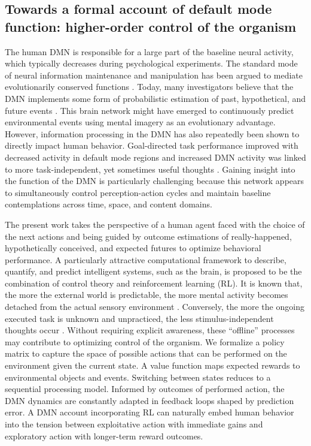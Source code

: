 \documentclass[10pt,letterpaper]{article}
\begin{document}
\subsection{Towards a formal account of default mode function: higher-order control of the organism}
The human DMN is responsible for a large part of the baseline neural activity,
which typically decreases during psychological experiments.
The standard mode of
neural information maintenance and manipulation has
been argued to mediate evolutionarily conserved functions
\citep{brown1914nature, binder1999conceptual, buzsaki2006rhythms}.
Today, many investigators believe that the DMN implements some form of
probabilistic estimation of past, hypothetical, and
future events
\citep{fox2005, hassabis2007patients, schacter2007remembering, binder2009,
randy2008}.
This brain network
might have emerged to continuously predict environmental events using
mental imagery as an evolutionary advantage.
%
However, information processing in the DMN has also repeatedly
been shown to directly impact human behavior. Goal-directed task performance
improved with decreased activity in default mode regions \citep{weiss2006}
and increased DMN activity was linked to more task-independent,
yet sometimes useful thoughts
\citep{mason2007, seli2016mind}.
%
Gaining insight into the function of the DMN is
particularly challenging because
this network appears to
simultaneously control perception-action cycles and
maintain baseline contemplations
across time, space, and content domains.


The present work takes the perspective of
a human agent faced with the choice of the next actions
and being guided by outcome estimations
of really-happened, hypothetically conceived, and
expected futures to optimize behavioral performance.
A particularly attractive computational framework
to describe, quantify, and predict intelligent systems, such as the brain,
is proposed to be the combination of control theory and
reinforcement learning (RL).
It is known that, the more the external world is predictable,
the more mental activity becomes detached from the actual sensory environment
\citep{antrobus1966studies, pope1978regulation}.
Conversely,
the more the ongoing executed task is unknown and unpracticed,
the less stimulus-independent thoughts occur
\citep{filler1973daydreaming, teasdale1995stimulus, christoff2016mind}.
Without requiring explicit awareness,
these ``offline'' processes may contribute
to optimizing control of the organism.
We formalize
a policy matrix to capture the space of possible actions that can be performed
on the environment given the current state. A value function
maps expected rewards to environmental objects and events.
Switching between states reduces to a sequential processing model.
Informed by outcomes of performed action,
the DMN dynamics are constantly adapted in feedback loops
shaped by prediction error.
A DMN account incorporating RL can naturally embed human behavior
into the tension between exploitative action with immediate gains and
exploratory action with longer-term reward outcomes.
\end{document}
